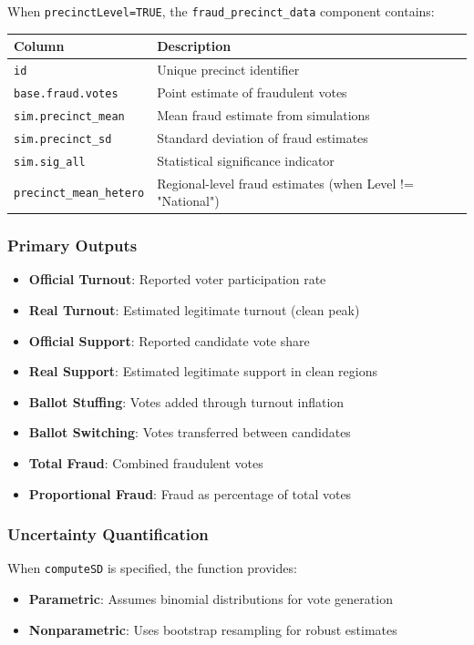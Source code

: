 \documentclass{article}
\begin{document}
When \texttt{precinctLevel=TRUE}, the \texttt{fraud\_precinct\_data} component contains:

\begin{longtable}{p{5cm}p{9cm}}
\toprule
\textbf{Column} & \textbf{Description} \\
\midrule
\texttt{id} & Unique precinct identifier \\
\texttt{base.fraud.votes} & Point estimate of fraudulent votes \\
\texttt{sim.precinct\_mean} & Mean fraud estimate from simulations \\
\texttt{sim.precinct\_sd} & Standard deviation of fraud estimates \\
\texttt{sim.sig\_all} & Statistical significance indicator \\
\texttt{precinct\_mean\_hetero} & Regional-level fraud estimates (when Level != "National") \\
\bottomrule
\end{longtable}

\subsubsection{Primary Outputs}
\begin{itemize}
    \item \textbf{Official Turnout}: Reported voter participation rate
    \item \textbf{Real Turnout}: Estimated legitimate turnout (clean peak)
    \item \textbf{Official Support}: Reported candidate vote share
    \item \textbf{Real Support}: Estimated legitimate support in clean regions
    \item \textbf{Ballot Stuffing}: Votes added through turnout inflation
    \item \textbf{Ballot Switching}: Votes transferred between candidates
    \item \textbf{Total Fraud}: Combined fraudulent votes
    \item \textbf{Proportional Fraud}: Fraud as percentage of total votes
\end{itemize}

\subsubsection{Uncertainty Quantification}
When \texttt{computeSD} is specified, the function provides:

\begin{itemize}
    \item \textbf{Parametric}: Assumes binomial distributions for vote generation
    \item \textbf{Nonparametric}: Uses bootstrap resampling for robust estimates
\end{itemize}
\end{document}
